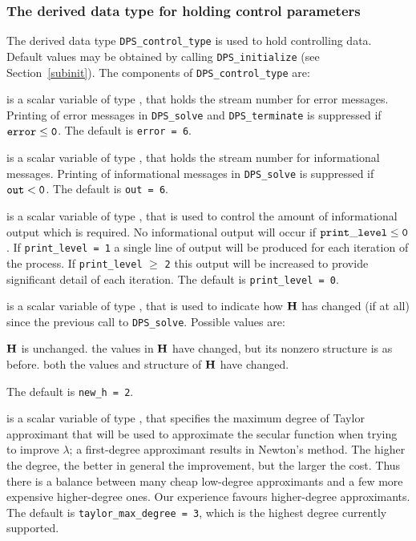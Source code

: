 \documentclass{galahad}
\newcommand{\packagename}{DPS}
\begin{document}

\subsubsection{The derived data type for holding control
 parameters}\label{typecontrol}
The derived data type
{\tt \packagename\_control\_type}
is used to hold controlling data. Default values may be obtained by calling
{\tt \packagename\_initialize}
(see Section~\ref{subinit}). The components of
{\tt \packagename\_control\_type}
are:

\begin{description}
 is a scalar variable of type \integer, that holds the
stream number for error messages.
Printing of error messages in
{\tt \packagename\_solve} and {\tt \packagename\_terminate}
is suppressed if ${\tt error} \leq {\tt 0}$.
The default is {\tt error = 6}.

 is a scalar variable of type \integer, that holds the
stream number for informational messages.
Printing of informational messages in
{\tt \packagename\_solve} is suppressed if ${\tt out} < {\tt 0}$.
The default is {\tt out = 6}.

 is a scalar variable of type \integer,
that is used
to control the amount of informational output which is required. No
informational output will occur if ${\tt print\_level} \leq {\tt 0}$. If
{\tt print\_level = 1} a single line of output will be produced for each
iteration of the process. If {\tt print\_level} $\geq$ {\tt 2} this output
will be increased to provide significant detail of each iteration.
The default is {\tt print\_level = 0}.

 is a scalar variable of type \integer, that is used
to indicate how ${\mathbf{H}}$ has changed (if at all) since the previous call
to {\tt \packagename\_solve}. Possible values are:
\begin{description}
 ${\mathbf{H}}$ is unchanged.
 the values in ${\mathbf{H}}$ have changed, but its nonzero structure
is as before.
 both the values and structure of ${\mathbf{H}}$ have changed.
\end{description}
The default is {\tt new\_h = 2}.

 is a scalar variable of type \integer,
that specifies the maximum degree of Taylor approximant that will be used
to approximate the secular function when trying to improve $\lambda$;
a first-degree approximant results in Newton's method.
The higher the degree, the better in general the improvement, but the larger the
cost. Thus there is a balance between many cheap low-degree approximants
and a few more expensive higher-degree ones. Our experience favours
higher-degree approximants.
The default is {\tt taylor\_max\_degree = 3}, which is the highest degree
currently supported.


\end{description}
\end{document}
